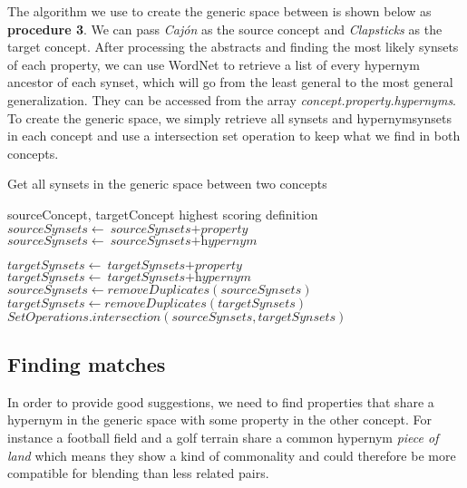 The algorithm we use to create the generic space between is shown below as \textbf{procedure 3}. We can pass \emph{Cajón} as the source concept and \emph{Clapsticks} as the target concept. After processing the abstracts and finding the most likely synsets of each property, we can use WordNet to retrieve a list of every hypernym ancestor of each synset, which will go from the least general to the most general generalization. They can be accessed from the array \emph{concept.property.hypernyms}. To create the generic space, we simply retrieve all synsets and hypernymsynsets in each concept and use a intersection set operation to keep what we find in both concepts.

\begin{algorithm}
	\caption{Get all synsets in the generic space between two concepts}\label{euclid}
	\begin{algorithmic}[1]
		\Require sourceConcept,
		targetConcept
		\Ensure highest scoring definition
		\State ${\textit{sourceSynsets} \gets {\textit{sourceSynsets} + \textit{property}}}$
		\State ${\textit{sourceSynsets} \gets {\textit{sourceSynsets} + \textit{hypernym}}}$
		\EndFor
		\EndFor
		
		\State ${\textit{targetSynsets} \gets {\textit{targetSynsets} + \textit{property}}}$
		\State ${\textit{targetSynsets} \gets {\textit{targetSynsets} + \textit{hypernym}}}$
		\EndFor
		\EndFor
		\State ${\textit{sourceSynsets} \gets {removeDuplicates(\textit{sourceSynsets})}}$
		\State ${\textit{targetSynsets} \gets {removeDuplicates(\textit{targetSynsets})}}$
		\State \Return ${SetOperations.intersection(\textit{sourceSynsets}, \textit{targetSynsets})}$
		\EndProcedure
	\end{algorithmic}
\end{algorithm}

\subsection{Finding matches}
In order to provide good suggestions, we need to find properties that share a hypernym in the generic space with some property in the other concept. For instance a football field and a golf terrain share a common hypernym \emph{piece of land} which means they show a kind of commonality and could therefore be more compatible for blending than less related pairs. 

